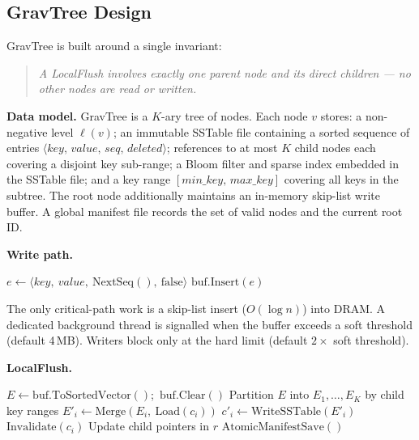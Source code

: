 \documentclass{jors}
\begin{document}
\subsection*{GravTree Design}

GravTree is built around a single invariant:

\begin{quote}
\textit{A LocalFlush involves exactly one parent node and its direct
children — no other nodes are read or written.}
\end{quote}

\textbf{Data model.} GravTree is a $K$-ary tree of nodes. Each node $v$
stores: a non-negative level $\ell(v)$; an immutable SSTable file
containing a sorted sequence of entries $\langle \mathit{key},\,
\mathit{value},\, \mathit{seq},\, \mathit{deleted} \rangle$; references
to at most $K$ child nodes each covering a disjoint key sub-range; a
Bloom filter and sparse index embedded in the SSTable file; and a key
range $[\mathit{min\_key},\, \mathit{max\_key}]$ covering all keys in
the subtree. The root node additionally maintains an in-memory skip-list
write buffer. A global manifest file records the set of valid nodes and
the current root ID.

\textbf{Write path.}

\begin{algorithm}[t]
\caption{Insert($key$, $value$)}
\begin{algorithmic}[1]
  \State {} 
\EndIf
\State $e \gets \langle key,\ value,\ \mathrm{NextSeq}(),\ \mathrm{false} \rangle$
\State $\mathrm{buf.Insert}(e)$ 
  \State {}
\EndIf
\end{algorithmic}
\end{algorithm}

The only critical-path work is a skip-list insert ($O(\log n)$) into
DRAM. A dedicated background thread is signalled when the buffer exceeds
a soft threshold (default 4\,MB). Writers block only at the hard limit
(default $2\times$ soft threshold).

\textbf{LocalFlush.}

\begin{algorithm}[t]
\caption{LocalFlush(root $r$)}
\begin{algorithmic}[1]
\State $E \gets \mathrm{buf.ToSortedVector}()$;\ $\mathrm{buf.Clear}()$
\State Partition $E$ into $E_1, \ldots, E_K$ by child key ranges
  \State $E'_i \gets \mathrm{Merge}(E_i,\ \mathrm{Load}(c_i))$
  \State $c'_i \gets \mathrm{WriteSSTable}(E'_i)$
  \State $\mathrm{Invalidate}(c_i)$
\EndFor
\State Update child pointers in $r$
\State $\mathrm{AtomicManifestSave}()$
\end{algorithmic}
\end{algorithm}
\end{document}
